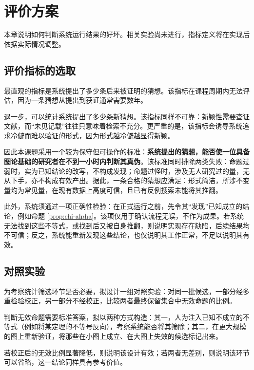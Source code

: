 
\section{评价方案}
\label{sec:evaluation}

本章说明如何判断系统运行结果的好坏。相关实验尚未进行，指标定义将在实现后依据实际情况调整。

\subsection{评价指标的选取}

最直观的指标是系统提出了多少条后来被证明的猜想。该指标在课程周期内无法评估，因为一条猜想从提出到获证通常需要数年。

退一步，可以统计系统提出了多少条新猜想。该指标同样不可靠：新颖性需要查证文献，而“未见记载”往往只意味着检索不充分。更严重的是，该指标会诱导系统追求冷僻而难以验证的形式，因为形式越冷僻越显得新颖。

因此本课题采用一个较为保守但可操作的标准：\textbf{系统提出的猜想，能否使一位具备图论基础的研究者在不到一小时内判断其真伪}。该标准同时排除两类失败：命题过弱时，实为已知结论的改写，不构成发现；命题过怪时，涉及无人研究过的量，无从下手，亦不构成有效产出。据此，一条合格的猜想应满足：形式简洁，所涉不变量均为常见量，在现有数据上高度可信，且已有反例搜索未能将其推翻。

此外，系统须通过一项正确性检验：在正式运行之前，先令其“发现”已知成立的结论，例如命题 \ref{prop:chi-alpha}。该项仅用于确认流程无误，不作为成果。若系统无法找到这些不等式，或找到后又被自身推翻，则说明实现存在缺陷，后续结果均不可信；反之，系统能重新发现这些结论，也仅说明其工作正常，不足以说明其有效。

\subsection{对照实验}

为考察统计筛选环节是否必要，拟设计一组对照实验：对同一批候选，一部分经多重检验校正，另一部分不经校正，比较两者最终保留集合中无效命题的比例。

判断无效命题需要标准答案，拟以两种方式构造：其一，人为注入已知不成立的不等式（例如将某定理的不等号反向），考察系统能否将其筛除；其二，在更大规模的图上重新验证，将那些在小图上成立、在大图上失效的候选标记出来。

若校正后的无效比例显著降低，则说明该设计有效；若两者无差别，则说明该环节可以省略，这一结论同样具有参考价值。

